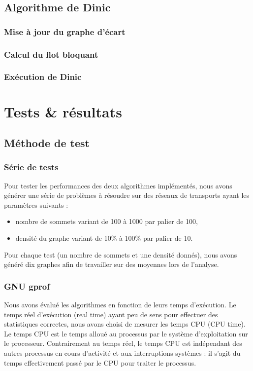 \subsection{Algorithme de Dinic}
\subsubsection{Mise à jour du graphe d'écart}


\subsubsection{Calcul du flot bloquant}


\subsubsection{Exécution de Dinic}



\section{Tests \& résultats}

\subsection{Méthode de test}

\subsubsection{Série de tests}
Pour tester les performances des deux algorithmes implémentés, nous avons générer une série de problèmes à résoudre sur des réseaux de transports ayant les paramètres suivants :
\begin{itemize}
\item nombre de sommets variant de 100 à 1000 par palier de 100,
\item densité du graphe variant de 10\% à 100\% par palier de 10.
\end{itemize}
Pour chaque test (un nombre de sommets et une densité donnés), nous avons généré dix graphes afin de travailler sur des moyennes lors de l'analyse.

\subsubsection{GNU gprof}
Nous avons évalué les algorithmes en fonction de leurs temps d'exécution. Le temps réel d'exécution (real time) ayant peu de sens pour effectuer des statistiques correctes, nous avons choisi de mesurer les temps CPU (CPU time). Le temps CPU est le temps alloué au processus par le système d'exploitation sur le processeur. Contrairement au temps réel, le temps CPU est indépendant des autres processus en cours d'activité et aux interruptions systèmes : il s'agit du temps effectivement passé par le CPU pour traiter le processus.

